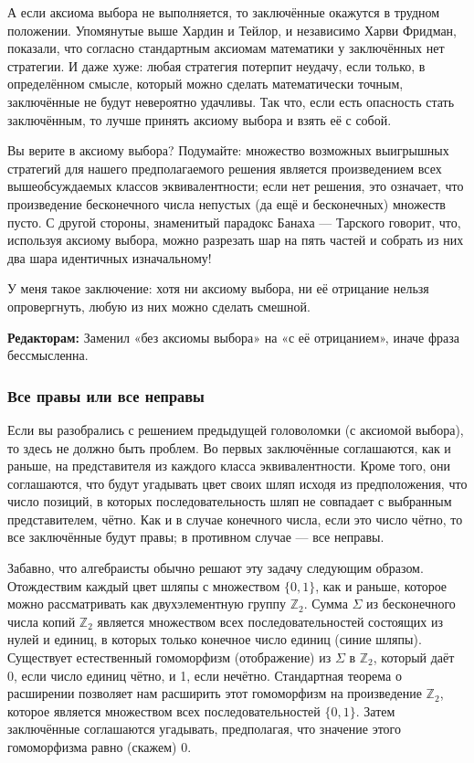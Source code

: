 А если аксиома выбора не выполняется, то заключённые окажутся в трудном положении.
Упомянутые выше Хардин и Тейлор, и независимо Харви Фридман, показали, что согласно стандартным аксиомам математики у заключённых нет стратегии.
И даже хуже: любая стратегия потерпит неудачу, если только, в определённом смысле, который можно сделать математически точным, заключённые не будут невероятно удачливы.
Так что, если есть опасность стать заключённым, то лучше принять аксиому выбора и взять её с собой.

Вы верите в аксиому выбора?
Подумайте: множество возможных выигрышных стратегий для нашего предполагаемого решения является произведением всех вышеобсуждаемых классов эквивалентности; если нет решения, это означает, что произведение бесконечного числа непустых (да ещё и бесконечных) множеств пусто.
С другой стороны, знаменитый парадокс Банаха --- Тарского говорит, что, используя аксиому выбора, можно разрезать шар на пять частей и собрать из них два шара идентичных изначальному!

У меня такое заключение: хотя ни аксиому выбора, ни её отрицание нельзя опровергнуть, любую из них можно сделать смешной.

\begin{addedbytheeditors}
\textbf{Редакторам:} Заменил «без аксиомы выбора» на «с её отрицанием», иначе фраза бессмысленна. 
\end{addedbytheeditors}


\subsubsection*{Все правы или все неправы}

Если вы разобрались с решением предыдущей головоломки (с аксиомой выбора), то здесь не должно быть проблем.
Во первых заключённые соглашаются, как и раньше, на представителя из каждого класса эквивалентности.
Кроме того, они соглашаются, что будут угадывать цвет своих шляп исходя из предположения, что число позиций, в которых последовательность шляп не совпадает с выбранным представителем, чётно.
Как и в случае конечного числа, если это число чётно, то все заключённые будут правы; в противном случае --- все неправы.

Забавно, что алгебраисты обычно решают эту задачу следующим образом.
Отождествим каждый цвет шляпы с множеством $\{0, 1\}$, как и раньше, которое можно рассматривать как двухэлементную группу $\mathbb{Z}_2$.
Сумма $\Sigma$ из бесконечного числа копий $\mathbb{Z}_2$ является множеством всех последовательностей состоящих из нулей и единиц, в которых только конечное число единиц (синие шляпы).
Существует естественный гомоморфизм (отображение) из $\Sigma$ в $\mathbb{Z}_2$, который даёт 0, если число единиц чётно, и 1, если нечётно.
Стандартная теорема о расширении позволяет нам расширить этот гомоморфизм на произведение $\mathbb{Z}_2$, которое является множеством всех последовательностей $\{0, 1\}$.
Затем заключённые соглашаются угадывать, предполагая, что значение этого гомоморфизма равно (скажем) 0.

